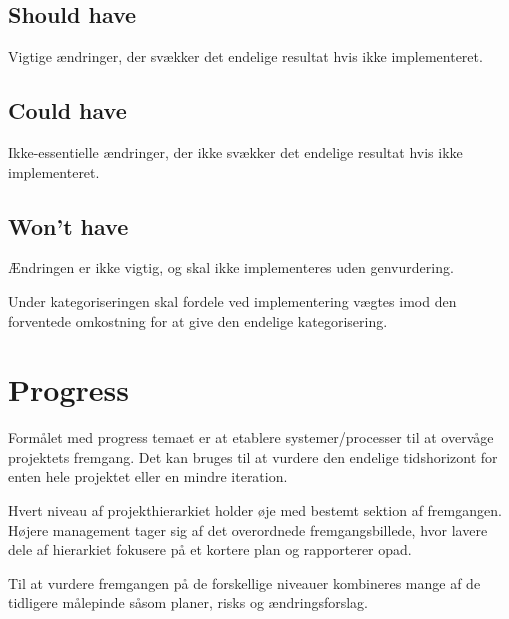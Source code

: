 \subsection{Should have}
Vigtige ændringer, der svækker det endelige resultat hvis ikke implementeret.

\subsection{Could have}
Ikke-essentielle ændringer, der ikke svækker det endelige resultat hvis ikke implementeret.

\subsection{Won't have}
Ændringen er ikke vigtig, og skal ikke implementeres uden genvurdering.

Under kategoriseringen skal fordele ved implementering vægtes imod den forventede omkostning for at give den endelige kategorisering.

\section{Progress}
Formålet med progress temaet er at etablere systemer/processer til at overvåge projektets fremgang. Det kan bruges til at vurdere den endelige tidshorizont for enten hele projektet eller en mindre iteration.

Hvert niveau af projekthierarkiet holder øje med bestemt sektion af fremgangen. Højere management tager sig af det overordnede fremgangsbillede, hvor lavere dele af hierarkiet fokusere på et kortere plan og rapporterer opad.

Til at vurdere fremgangen på de forskellige niveauer kombineres mange af de tidligere målepinde såsom planer, risks og ændringsforslag.
